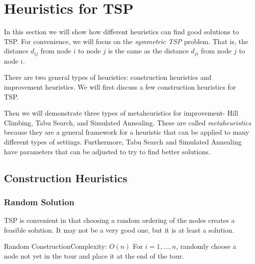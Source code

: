 
\chapter{Heuristics for TSP}

In this section we will show how different heuristics can find good solutions to TSP.  For convenience,  we will focus on the \emph{symmetric TSP} problem.  That is, the distance $d_{ij}$ from node $i$ to node $j$ is the same as the distance $d_{ji}$ from node $j$ to node $i$.

There are two general types of heuristics: construction heuristics and improvement heuristics.  We will first discuss a few construction heuristics for TSP.


Then we will demonstrate three types of metaheuristics for improvement- Hill Climbing, Tabu Search, and Simulated Annealing.  These are called \emph{metaheuristics} because they are a general framework for a heuristic that can be applied to many different types of settings.  Furthermore, Tabu Search and Simulated Annealing have parameters that can be adjusted to try to find better solutions.  

\section{Construction Heuristics}
\subsection{Random Solution}
TSP is convenient in that choosing a random ordering of the nodes creates a feasible solution.  It may not be a very good one, but it is at least a solution.

\begin{general}{Random Construction}{Complexity: $O(n)$}
\label{heuristic:random}
For $i=1, \dots, n$, randomly choose a node not yet in the tour and place it at the end of the tour.
\end{general}

